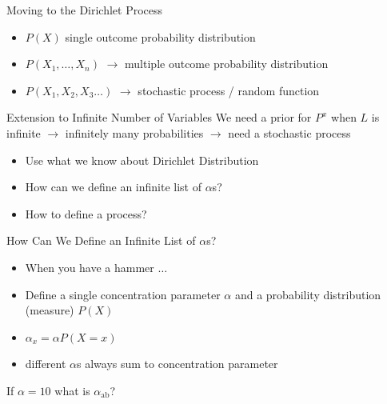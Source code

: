 \documentclass[11pt]{beamer}
\begin{document}
	\begin{frame}{Moving to the Dirichlet Process}
		
		\begin{itemize}
			\item $P(X)$ single outcome probability distribution
			\item $P(X_1,\dots,X_n)$ $\rightarrow$ multiple outcome probability distribution
			\item $P(X_1,X_2,X_3\dots)$ $\rightarrow$ stochastic process / random function
		\end{itemize}
	\end{frame}
	
	\begin{frame}{Extension to Infinite Number of Variables}
		We need a prior for $P^x$ when $L$ is infinite $\rightarrow$ infinitely many probabilities $\rightarrow$ need a stochastic process
	
		\begin{itemize}
			\item Use what we know about Dirichlet Distribution
			\item How can we define an infinite list of $\alpha$s?
			\item How to define a process?
		\end{itemize}
	\end{frame}
	
	\begin{frame}{How Can We Define an Infinite List of $\alpha$s?}
		\centering
		
		\begin{itemize}
			\item When you have a hammer $\dots$
			\item Define a single concentration parameter $\alpha$ and a  probability distribution (measure) $P(X)$
			\item $\alpha_x = \alpha P(X = x)$
			\item different $\alpha$s always sum to concentration parameter
		\end{itemize}
		
		
		\vspace{10pt} If $\alpha = 10$ what is $\alpha_{\text{ab}}$?
	\end{frame}
	
\end{document}
